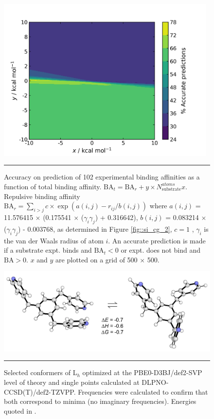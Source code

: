 \documentclass[../../main.tex]{subfiles}
\begin{document}
\begin{figure}[h!]
	\vspace{0.4cm}
	\centering
	\includegraphics[width=11cm]{3/cgbind/figs/figS4}
	\vspace{0.2cm}
	\hrule
	\caption{Accuracy on prediction of 102 experimental binding affinities as a function of total binding affinity. $\text{BA}_t = \text{BA}_r + y \times N_\text{substrate}^{atoms} x$. Repulsive binding affinity $\text{BA}_r = \sum_{i>j} c \times \exp(a(i, j) - r_{ij}/b(i, j))$ where $a(i, j)$ = 11.576415 $\times$ (0.175541 $\times$ ($\gamma_i \gamma_j$) + 0.316642), $b(i, j)$ = 0.083214 $\times$ ($\gamma_i \gamma_j$) - 0.003768, as determined in Figure \ref{fig::si_cg_2}, $c = 1$ \kcal, $\gamma_i$ is the van der Waals radius of atom $i$. An accurate prediction is made if a substrate expt. binds and $\text{BA}_{t} < 0$ or expt. does not bind and $\text{BA} > 0$. $x$ and $y$ are plotted on a grid of 500 × 500.}
	\label{fig::sicg_4}
\end{figure}


\begin{figure}[h!]
	\vspace{0.4cm}
	\centering
	\includegraphics[width=13cm]{3/cgbind/figs/figS5}
	\vspace{0.2cm}
	\hrule
	\caption{Selected conformers of L$_h$ optimized at the PBE0-D3BJ/def2-SVP level of theory and single points calculated at DLPNO-CCSD(T)/def2-TZVPP. Frequencies were calculated to confirm that both correspond to minima (no imaginary frequencies). Energies quoted in \kcal.}
	\label{fig::si_cg_5}
\end{figure}
\end{document}
